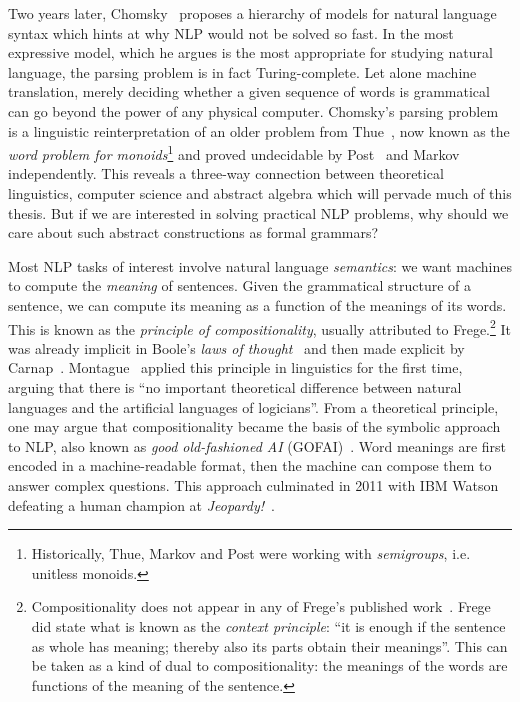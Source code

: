 Two years later, Chomsky~\cite{Chomsky56, Chomsky57} proposes a hierarchy of models for natural language syntax which hints at why NLP would not be solved so fast.
In the most expressive model, which he argues is the most appropriate for studying natural language, the parsing problem is in fact Turing-complete.
Let alone machine translation, merely deciding whether a given sequence of words is grammatical can go beyond the power of any physical computer.
Chomsky's parsing problem is a linguistic reinterpretation of an older problem from Thue~\cite{Thue14}, now known as the \emph{word problem for monoids}\footnote
{Historically, Thue, Markov and Post were working with \emph{semigroups}, i.e. unitless monoids.
} and proved undecidable by Post~\cite{Post47} and Markov~\cite{Markov47} independently.
This reveals a three-way connection between theoretical linguistics, computer science and abstract algebra which will pervade much of this thesis.
But if we are interested in solving practical NLP problems, why should we care about such abstract constructions as formal grammars?

Most NLP tasks of interest involve natural language \emph{semantics}: we want machines to compute the \emph{meaning} of sentences.
Given the grammatical structure of a sentence, we can compute its meaning as a function of the meanings of its words.
This is known as the \emph{principle of compositionality}, usually attributed to Frege.\footnote
{Compositionality does not appear in any of Frege's published work~\cite{Pelletier01}.
Frege~\cite{Frege84} did state what is known as the \emph{context principle}:
``it is enough if the sentence as whole has meaning; thereby also its parts obtain their meanings''.
This can be taken as a kind of dual to compositionality: the meanings of the words are functions of the meaning of the sentence.}
It was already implicit in Boole's \emph{laws of thought}~\cite{Boole54} and then made explicit by Carnap~\cite{Carnap47}.
Montague~\cite{Montague70,Montague70a,Montague73} applied this principle in linguistics for the first time, arguing that there is ``no important theoretical difference between natural languages and the artificial languages of logicians''.
From a theoretical principle, one may argue that compositionality became the basis of the symbolic approach to NLP, also known as \emph{good old-fashioned AI} (GOFAI)~\cite{Haugeland89}.
Word meanings are first encoded in a machine-readable format, then the machine can compose them to answer complex questions.
This approach culminated in 2011 with IBM Watson defeating a human champion at \emph{Jeopardy!}~\cite{LallyFodor11}.

